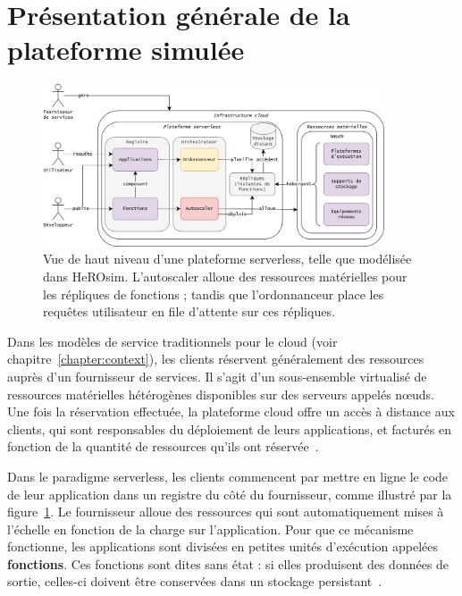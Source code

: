 \section{Présentation générale de la plateforme simulée}
\label{section:herosim-overview}

\begin{figure}[!ht]
    \centering
    \includegraphics[width=0.9\textwidth]{6_Chapitre6/figures/platform-complete.png}
    \caption{Vue de haut niveau d'une plateforme serverless, telle que modélisée dans HeROsim. L'autoscaler alloue des ressources matérielles pour les répliques de fonctions ; tandis que l'ordonnanceur place les requêtes utilisateur en file d'attente sur ces répliques.}
\label{figure:herosim-platform}
\end{figure}

Dans les modèles de service traditionnels pour le cloud (voir chapitre~\ref{chapter:context}), les clients réservent généralement des ressources auprès d'un fournisseur de services. Il s'agit d'un sous-ensemble virtualisé de ressources matérielles hétérogènes disponibles sur des serveurs appelés nœuds. Une fois la réservation effectuée, la plateforme cloud offre un accès à distance aux clients, qui sont responsables du déploiement de leurs applications, et facturés en fonction de la quantité de ressources qu'ils ont réservée~\cite{Lannurien2023}.

Dans le paradigme serverless, les clients commencent par mettre en ligne le code de leur application dans un registre du côté du fournisseur, comme illustré par la figure~\ref{figure:herosim-platform}. Le fournisseur alloue des ressources qui sont automatiquement mises à l'échelle en fonction de la charge sur l'application. Pour que ce mécanisme fonctionne, les applications sont divisées en petites unités d'exécution appelées \textbf{fonctions}. Ces fonctions sont dites sans état : si elles produisent des données de sortie, celles-ci doivent être conservées dans un stockage persistant~\cite{yuFollowingDataNot}.

